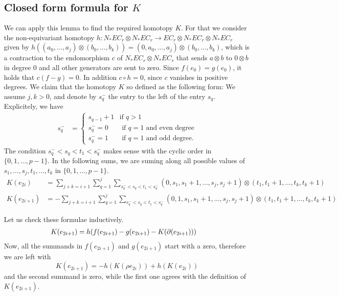 \subsection{Closed form formula for $K$}

We can apply this lemma to find the required homotopy $K$. For that we consider the non-equivariant homotopy $h\colon N_*EC_r\otimes N_*EC_r\to EC_r\otimes N_*EC_r\otimes N_*EC_r$ given by $h((a_0,\ldots,a_j)\otimes(b_0,\ldots,b_k)) = (0,a_0,\ldots,a_j)\otimes(b_0,\ldots,b_k)$, which is a contraction to the endomorphism $c$ of $N_*EC_r\otimes N_*EC_r$ that sends $a\otimes b$ to $0\otimes b$ in degree $0$ and all other generators are sent to zero. Since $f(e_0) = g(e_0)$, it holds that $c(f-g) = 0$. In addition $c\circ h = 0$, since $c$ vanishes in positive degrees. We claim that the homotopy $K$ so defined as the following form: We assume $j,k>0$, and denote by $s_q^-$ the entry to the left of the entry $s_q$. Explicitely, we have
\begin{align*}
	s_q^- &= \begin{cases}s_{q-1}+1 & \text{if $q>1$}\\
		s_q^- = 0 & \text{ if $q=1$ and even degree} \\
		s_q^- = 1 &\text{ if $q=1$ and odd degree.}
	\end{cases}
\end{align*}
The condition $s_q^-<s_q<t_1<s_q^-$ makes sense with the cyclic order in $\{0,1,\ldots,p-1\}$. In the following sums, we are suming along all possible values of $s_1,\ldots,s_j,t_1,\ldots,t_k$ in $\{0,1,\ldots,p-1\}$.
\begin{align*}
	K(e_{2i}) &= \sum_{j+k = i+1}{\sum_{q=1}^j{\sum_{s_q^-<s_q<t_1<s_q^-}{(0,s_1,s_1+1,\ldots,s_j,s_j+1)\otimes(t_1,t_1+1,\ldots,t_k,t_k+1)}}} \\
	K(e_{2i+1}) &= -\sum_{j+k = i+1}{\sum_{q=1}^j{\sum_{s_q^-<s_q<t_1<s_q^-}{(0,1,s_1,s_1+1,\ldots,s_j,s_j+1)\otimes(t_1,t_1+1,\ldots,t_k,t_k+1)}}}
\end{align*}

Let us check these formulae inductively.
\begin{align*}
	K(e_{2i+1}) &= h(f(e_{2i+1})-g(e_{2i+1})-K(\operatorname{\partial}(e_{2i+1})))
\end{align*}
Now, all the summands in $f(e_{2i+1})$ and $g(e_{2i+1})$ start with a zero, therefore we are left with
\[K(e_{2i+1}) = -h(K(\rho e_{2i}))+h(K(e_{2i}))\]
and the second summand is zero, while the first one agrees with the definition of $K(e_{2i+1})$.


